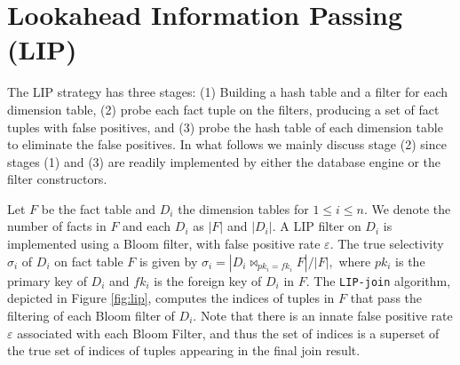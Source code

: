 \documentclass[10pt]{article}
\newcommand{\JOIN}{\bowtie}
\begin{document}




\section{Lookahead Information Passing (LIP)}

The LIP strategy has three stages: (1) Building a hash table and a filter for each dimension table, (2) probe each fact tuple on the filters, producing a set of fact tuples with false positives, and (3) probe the hash table of each dimension table to eliminate the false positives. In what follows we mainly discuss stage (2) since stages (1) and (3) are readily implemented by either the database engine or the filter constructors.

Let $F$ be the fact table and $D_i$ the dimension tables for $1 \leq i \leq n$. We denote the number of facts in $F$ and each $D_i$ as $|F|$ and $|D_i|$. A LIP filter on $D_i$ is implemented using a Bloom filter, with false positive rate $\varepsilon$. The true selectivity $\sigma_i$ of $D_i$ on fact table $F$ is given by $\sigma_i = |D_i \JOIN_{pk_i = fk_i} F| / |F|,$ where $pk_i$ is the primary key of $D_i$ and $fk_i$ is the foreign key of $D_i$ in $F$. The \texttt{LIP-join} algorithm, depicted in Figure \ref{fig:lip}, computes the indices of tuples in $F$ that pass the filtering of each Bloom filter of $D_i$. Note that there is an innate false positive rate $\varepsilon$ associated with each Bloom Filter, and thus the set of indices is a superset of the true set of indices of tuples appearing in the final join result.
\end{document}
